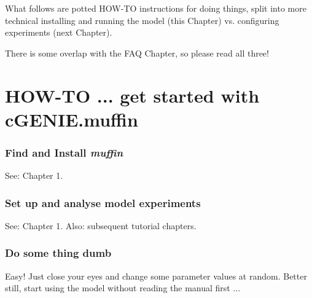 \documentclass[11pt,fleqn]{book} %
\begin{document}
\hfill \break
\vspace{24mm}

\Large
What follows are potted HOW-TO instructions for doing things, split into more technical installing and running the model (this Chapter) vs. configuring experiments (next Chapter).
\vspace{2mm}

There is some overlap with the FAQ Chapter, so please read all three!
\normalsize


\newpage


\section{HOW-TO ... get started with cGENIE.muffin}\label{how-to-0}
\vspace{2mm}

%
\subsubsection{Find and Install \textbf{\textit{muffin}}}\label{Install cGENIE}

\vspace{1mm}
See: Chapter 1.

%
\subsubsection{Set up and analyse model experiments}

\vspace{1mm}
See: Chapter 1.
\noindent Also: subsequent tutorial chapters.

%
\subsubsection{Do some thing dumb}\label{Do some thing dumb}

\vspace{1mm}
Easy! Just close your eyes and change some parameter values at random. Better still, start using the model without reading the manual first ...

\end{document}
